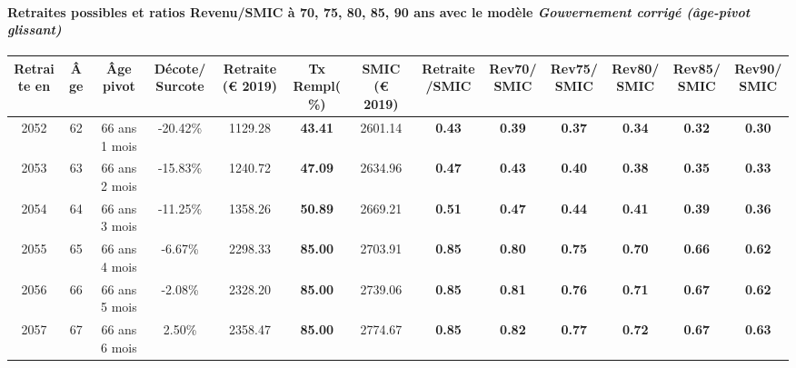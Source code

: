 \paragraph{Retraites possibles et ratios Revenu/SMIC à 70, 75, 80, 85, 90 ans avec le modèle \emph{Gouvernement corrigé (âge-pivot glissant)}}  
 
{ \scriptsize \begin{center} 
\begin{tabular}[htb]{|c|c||c|c||c|c||c||c|c|c|c|c|c|} 
\hline 
 Retraite en &  Âge &  Âge pivot &  Décote/Surcote &  Retraite (\euro{} 2019) &  Tx Rempl(\%) &  SMIC (\euro{} 2019) &  Retraite/SMIC &  Rev70/SMIC &  Rev75/SMIC &  Rev80/SMIC &  Rev85/SMIC &  Rev90/SMIC \\ 
\hline \hline 
 2052 &  62 &  66 ans 1 mois &  -20.42\% &  1129.28 &  {\bf 43.41} &  2601.14 &  {\bf {\color{red} 0.43}} &  {\bf {\color{red} 0.39}} &  {\bf {\color{red} 0.37}} &  {\bf {\color{red} 0.34}} &  {\bf {\color{red} 0.32}} &  {\bf {\color{red} 0.30}} \\ 
\hline 
 2053 &  63 &  66 ans 2 mois &  -15.83\% &  1240.72 &  {\bf 47.09} &  2634.96 &  {\bf {\color{red} 0.47}} &  {\bf {\color{red} 0.43}} &  {\bf {\color{red} 0.40}} &  {\bf {\color{red} 0.38}} &  {\bf {\color{red} 0.35}} &  {\bf {\color{red} 0.33}} \\ 
\hline 
 2054 &  64 &  66 ans 3 mois &  -11.25\% &  1358.26 &  {\bf 50.89} &  2669.21 &  {\bf {\color{red} 0.51}} &  {\bf {\color{red} 0.47}} &  {\bf {\color{red} 0.44}} &  {\bf {\color{red} 0.41}} &  {\bf {\color{red} 0.39}} &  {\bf {\color{red} 0.36}} \\ 
\hline 
 2055 &  65 &  66 ans 4 mois &  -6.67\% &  2298.33 &  {\bf 85.00} &  2703.91 &  {\bf {\color{red} 0.85}} &  {\bf {\color{red} 0.80}} &  {\bf {\color{red} 0.75}} &  {\bf {\color{red} 0.70}} &  {\bf {\color{red} 0.66}} &  {\bf {\color{red} 0.62}} \\ 
\hline 
 2056 &  66 &  66 ans 5 mois &  -2.08\% &  2328.20 &  {\bf 85.00} &  2739.06 &  {\bf {\color{red} 0.85}} &  {\bf {\color{red} 0.81}} &  {\bf {\color{red} 0.76}} &  {\bf {\color{red} 0.71}} &  {\bf {\color{red} 0.67}} &  {\bf {\color{red} 0.62}} \\ 
\hline 
 2057 &  67 &  66 ans 6 mois &  2.50\% &  2358.47 &  {\bf 85.00} &  2774.67 &  {\bf {\color{red} 0.85}} &  {\bf {\color{red} 0.82}} &  {\bf {\color{red} 0.77}} &  {\bf {\color{red} 0.72}} &  {\bf {\color{red} 0.67}} &  {\bf {\color{red} 0.63}} \\ 
\hline 
\hline 
\end{tabular} 
\end{center} } 
